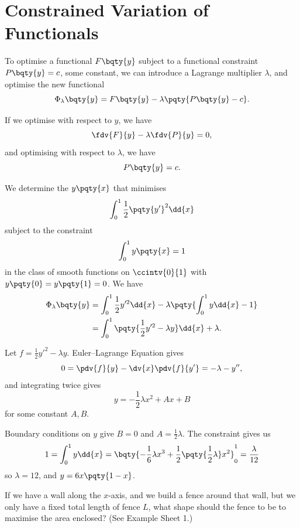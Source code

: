 \section{Constrained Variation of Functionals}

To optimise a functional \(F\bqty{y}\) subject to a functional constraint \(P\bqty{y} = c\), some constant, we can introduce a Lagrange multiplier \(\lambda\), and optimise the new functional
\[
    \Phi_\lambda \bqty{y} = F\bqty{y} - \lambda \pqty{P\bqty{y} - c}.
\]

If we optimise with respect to \(y\), we have
\[
    \fdv{F}{y} - \lambda \fdv{P}{y} = 0,
\]
and optimising with respect to \(\lambda\), we have
\[
    P\bqty{y} = c.
\]

\begin{example}
    We determine the \(y\pqty{x}\) that minimises
    \[
        \int_{0}^{1} \frac{1}{2} \pqty{y'}^2 \dd{x}
    \]
    subject to the constraint
    \[
        \int_{0}^{1} y\pqty{x} = 1
    \]
    in the class of smooth functions on \(\ccintv{0}{1}\) with \(y\pqty{0} = y\pqty{1} = 0\). We have
    \begin{align*}
        \Phi_\lambda \bqty{y} &= \int_{0}^{1} \frac{1}{2} y'^2 \dd{x} - \lambda \pqty{\int_{0}^{1} y \dd{x} - 1} \\
        &= \int_{0}^{1} \pqty{\frac{1}{2} y'^2 - \lambda y} \dd{x} + \lambda.
    \end{align*}

    Let \(f = \frac{1}{2} y'^2 - \lambda y\). Euler--Lagrange Equation gives
    \[
        0 = \pdv{f}{y} - \dv{x}\pdv{f}{y'} = -\lambda - y'',
    \]
    and integrating twice gives
    \[
        y = - \frac{1}{2} \lambda x^2 + Ax + B
    \]
    for some constant \(A, B\).

    Boundary conditions on \(y\) give \(B = 0\) and \(A = \frac{1}{2} \lambda\). The constraint gives us
    \[
        1 = \int_{0}^{1} y \dd{x} = \bqty{- \frac{1}{6} \lambda x^3 + \frac{1}{2} \pqty{\frac{1}{2} \lambda} x^2}_{0}^{1} = \frac{\lambda}{12}
    \]
    so \(\lambda = 12\), and \(y = 6x \pqty{1 - x}\).
\end{example}

\begin{example}
    If we have a wall along the \(x\)-axis, and we build a fence around that wall, but we only have a fixed total length of fence \(L\), what shape should the fence to be to maximise the area enclosed? (See Example Sheet 1.)
\end{example}

